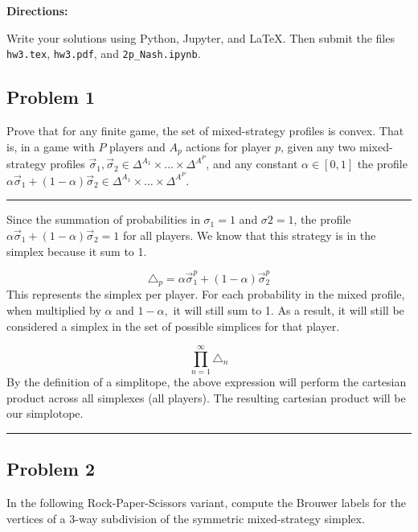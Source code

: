 \documentclass[11pt]{article}
\newcommand{\titlebox}[3]{
    \begin{center}
        \framebox{
            \vbox{
            \hbox to \textwidth { #1 \hfill #3}
            \vspace{-4mm}
            \hbox to \textwidth {\hfill \Large \bf #2 \hfill}
        }
    }
    \end{center}
}
\newcommand{\answer}[1]{
\vspace{.5\baselineskip} \hrule \vspace{.5\baselineskip}
#1
\vspace{.5\baselineskip} \hrule \vspace{.5\baselineskip}
}
\begin{document}
\titlebox{CSC 383, S'23}
{Homework 3}
{Due Mar. \nth{3}}

\textbf{Directions:}

Write your solutions using Python, Jupyter, and \LaTeX.
Then submit the files \texttt{hw3.tex}, \texttt{hw3.pdf}, and \texttt{2p\_Nash.ipynb}.



\subsection*{Problem 1}

Prove that for any finite game, the set of mixed-strategy profiles is convex.
That is, in a game with $P$ players and $A_p$ actions for player $p$, given any two mixed-strategy profiles $\vec{\sigma}_1, \vec{\sigma}_2 \in \Delta^{A_1} \times \ldots \times \Delta^{A^P}$, and any constant $\alpha \in [0,1]$ the profile $\alpha \vec{\sigma}_1 + (1 - \alpha) \vec{\sigma}_2 \in \Delta^{A_1} \times \ldots \times \Delta^{A^P}$.

\answer{

Since the summation of probabilities in $\sigma_{1} = 1$ and $\sigma{2} = 1$, the profile $\alpha \vec{\sigma}_1 + (1 - \alpha) \vec{\sigma}_2 = 1$ for all players.  We know that this strategy is in the simplex because it sum to 1.  
$ $\newline

\[\triangle_{p} = \alpha \vec{\sigma}_{1}^{p} + (1-\alpha) \vec{\sigma}_{2}^{p} \] This represents the simplex per player.  For each probability in the mixed profile, when multiplied by $\alpha$ and $1-\alpha, $ it will still sum to 1.  As a result, it will still be considered a simplex in the set of possible simplices for that player.
$ $\newline

\[ \prod_{n=1}^{\infty} \triangle_{n} \]
By the definition of a simplitope, the above expression will perform the cartesian product across all simplexes (all players).  The resulting cartesian product will be our simplotope.

}

\subsection*{Problem 2}
In the following Rock-Paper-Scissors variant, compute the Brouwer labels for the vertices of a 3-way subdivision of the symmetric mixed-strategy simplex.
\end{document}
